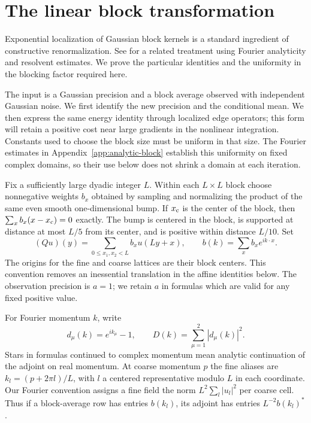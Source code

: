 \section{The linear block transformation}
\label{free:section}

Exponential localization of Gaussian block kernels is a standard
ingredient of constructive renormalization. See
\cite{DybalskiStottmeisterTanimotoGreen} for a related treatment using
Fourier analyticity and resolvent estimates. We prove the particular
identities and the uniformity in the blocking factor required here.

The input is a Gaussian precision and a block average observed with
independent Gaussian noise. We first identify the new precision and the
conditional mean. We then express the same energy identity through
localized edge operators; this form will retain a positive cost near
large gradients in the nonlinear integration. Constants used to choose
the block size must be uniform in that size. The Fourier estimates in
Appendix~\ref{app:analytic-block} establish this uniformity on fixed
complex domains, so their use below does not shrink a domain at each
iteration.

Fix a sufficiently large dyadic integer $L$. Within each $L\times L$
block choose nonnegative weights $b_x$ obtained by sampling and
normalizing the product of the same even smooth one-dimensional bump.
If $x_{\rm c}$ is the center of the block, then
$\sum_xb_x(x-x_{\rm c})=0$ exactly. The bump is centered in the
block, is supported at distance at most $L/5$ from its center, and is
positive within distance $L/10$. Set
\[
 (Qu)(y)=\sum_{0\le x_1,x_2<L}b_xu(Ly+x),\qquad
 b(k)=\sum_xb_xe^{ik\cdot x}.
\]
The origins for the fine and coarse lattices are their block centers.
This convention removes an inessential translation in the affine
identities below. The observation precision is $a=1$; we retain $a$ in
formulas which are valid for any fixed positive value.

For Fourier momentum $k$, write
\[
 d_\mu(k)=e^{ik_\mu}-1,\qquad
 D(k)=\sum_{\mu=1}^2|d_\mu(k)|^2.
\]
Stars in formulas continued to complex momentum mean analytic
continuation of the adjoint on real momentum. At coarse momentum $p$ the
fine aliases are $k_l=(p+2\pi l)/L$, with $l$ a centered representative
modulo $L$ in each coordinate. Our Fourier convention assigns a fine
field the norm $L^2\sum_l|u_l|^2$ per coarse cell. Thus if a block-average
row has entries $b(k_l)$, its adjoint has entries $L^{-2}b(k_l)^*$.

